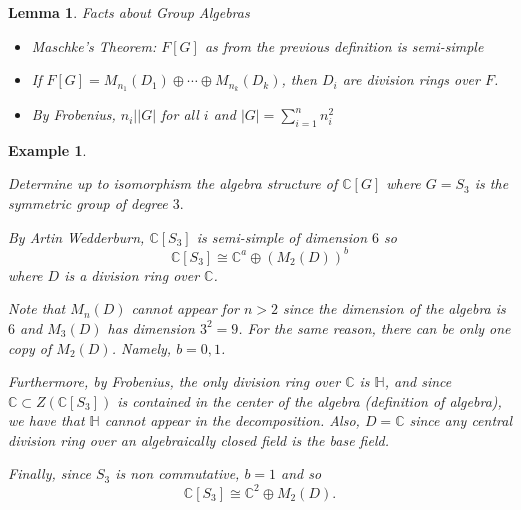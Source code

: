 \documentclass[12pt]{Qual}
\newtheorem{example}{Example}
\newtheorem{lemma}{Lemma}
\begin{document}
\vspace{0.5cm}
\begin{lemma}{\Large\textit{Facts about Group Algebras}}

\begin{itemize}
\renewcommand\labelitemi{\faCoffee}
    \item Maschke's Theorem: $F[G]$ as from the previous definition is semi-simple
    \item If $F[G]=M_{n_1}(D_1)\oplus\cdots\oplus M_{n_k}(D_k)$, then $D_i$ are division rings over $F$.
    \item By Frobenius, $n_i||G|$ for all $i$ and $|G|=\sum_{i=1}^nn_i^2$
\end{itemize}

\end{lemma}
\vspace{0.5cm}
\begin{example}
$\,$

\begin{framed}
Determine up to isomorphism the algebra structure of $\mathbb{C}[G]$ where $G=S_3$ is the symmetric group of degree $3.$
\end{framed}

By Artin Wedderburn, $\mathbb{C}[S_3]$ is semi-simple of dimension $6$ so $$\mathbb{C}[S_3]\cong\mathbb{C}^a\oplus (M_2(D))^b$$ where $D$ is a division ring over $\mathbb{C}$.

Note that $M_n(D)$ cannot appear for $n>2$ since the dimension of the algebra is $6$ and $M_3(D)$ has dimension $3^2=9$. For the same reason, there can be only one copy of $M_2(D)$. Namely, $b=0,1$.

Furthermore, by Frobenius, the only division ring over $\mathbb{C}$ is $\mathbb{H}$, and since $\mathbb{C}\subset Z(\mathbb{C}[S_3])$ is contained in the center of the algebra (definition of algebra), we have that $\mathbb{H}$ cannot appear in the decomposition. Also, $D=\mathbb{C}$ since any central division ring over an algebraically closed field is the base field.

Finally, since $S_3$ is non commutative, $b=1$ and so $$\mathbb{C}[S_3]\cong\mathbb{C}^2\oplus M_2(D).$$
\end{example}
\vspace{0.5cm}
\end{document}
